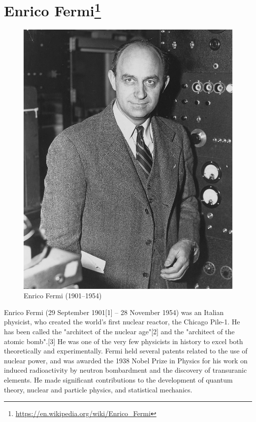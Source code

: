 \section*{Enrico Fermi\protect\footnote{\url{https://en.wikipedia.org/wiki/Enrico_Fermi}}}

\begin{figure}[ht]
  \centering
  \includegraphics[width=0.8\linewidth]{content/figures/fermi.jpeg}
  \caption{Enrico Fermi (1901–1954)\protect\footnotemark}
\end{figure}


Enrico Fermi (29 September 1901[1] – 28 November 1954) was an Italian physicist, who created the world's first nuclear reactor, the Chicago Pile-1. He has been called the "architect of the nuclear age"[2] and the "architect of the atomic bomb".[3] He was one of the very few physicists in history to excel both theoretically and experimentally. Fermi held several patents related to the use of nuclear power, and was awarded the 1938 Nobel Prize in Physics for his work on induced radioactivity by neutron bombardment and the discovery of transuranic elements. He made significant contributions to the development of quantum theory, nuclear and particle physics, and statistical mechanics.

